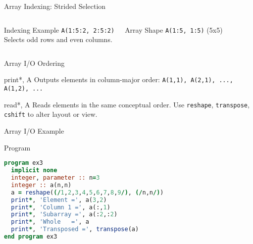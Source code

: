 \begin{frame}[fragile]{Array Indexing: Strided Selection}
  \begin{columns}[T]
    \begin{block}{Indexing Example}
      \texttt{A(1:5:2, 2:5:2)}\\[0.5em]
      Selects odd rows and even columns.
    \end{block}
    \begin{block}{Array Shape}
      \texttt{A(1:5, 1:5)} (5x5)
    \end{block}

  \end{columns}
\end{frame}



\begin{frame}{Array I/O Ordering}
  \begin{block}{print*, A}
    Outputs elements in column-major order: \texttt{A(1,1), A(2,1), ..., A(1,2), ...}
  \end{block}
  \begin{block}{read*, A}
    Reads elements in the same conceptual order. Use \texttt{reshape}, \texttt{transpose}, \texttt{cshift} to alter layout or view.
  \end{block}
\end{frame}

\begin{frame}[fragile]{Array I/O Example}
\begin{block}{Program}
\begin{lstlisting}[language=Fortran]
program ex3
  implicit none
  integer, parameter :: n=3
  integer :: a(n,n)
  a = reshape((/1,2,3,4,5,6,7,8,9/), (/n,n/))
  print*, 'Element =', a(3,2)
  print*, 'Column 1 =', a(:,1)
  print*, 'Subarray =', a(:2,:2)
  print*, 'Whole   =', a
  print*, 'Transposed =', transpose(a)
end program ex3
\end{lstlisting}
\end{block}
\end{frame}


